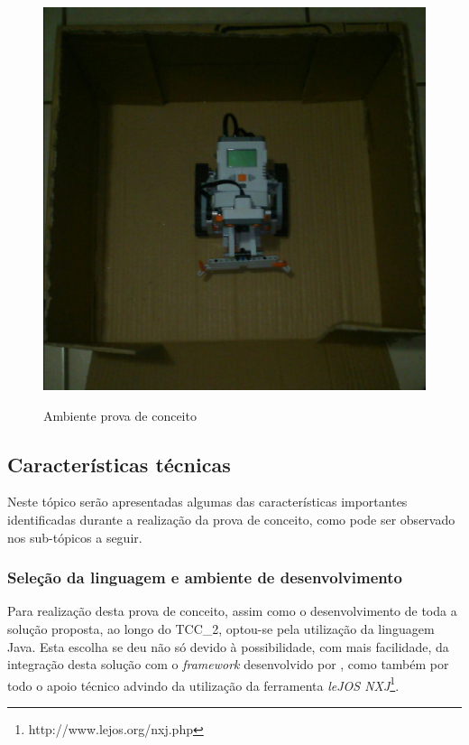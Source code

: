 		\begin{figure}[H]
			\centering
			\includegraphics[scale=0.4]{figuras/ambienteConceito.eps}
			\label{img:ambienteProva}
			\caption{Ambiente prova de conceito}
		\end{figure}


	\subsection{Características técnicas} %
	\label{sub:características_técnicas}
	
		Neste tópico serão apresentadas algumas das características importantes identificadas durante a realização da prova de conceito, como pode ser observado nos sub-tópicos a seguir.

		\subsubsection{Seleção da linguagem e ambiente de desenvolvimento}

		Para realização desta prova de conceito, assim como o desenvolvimento de toda a solução proposta, ao longo do TCC\_2, optou-se pela utilização da linguagem Java. Esta escolha se deu não só devido à possibilidade, com mais facilidade, da integração desta solução com o \textit{framework} desenvolvido por \cite{tccRodrigo}, como também por todo o apoio técnico advindo da utilização da ferramenta \textit{leJOS NXJ}\footnote{http://www.lejos.org/nxj.php}.

